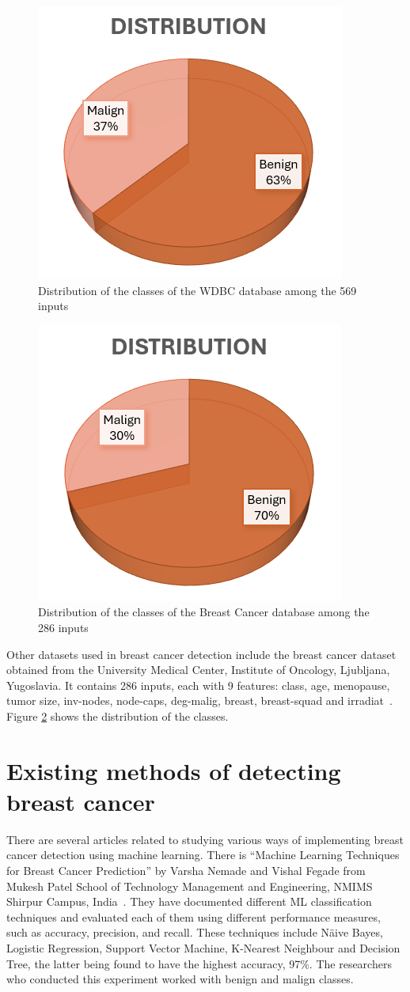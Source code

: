 \begin{figure}[ht!]
    \centering
    \includegraphics[width=0.5\linewidth]{figures/Figure34.png}
    \caption{Distribution of the classes of the WDBC database among the 569 inputs}
    \label{fig:fig28}
\end{figure}

\begin{figure}[H]
    \centering
    \includegraphics[width=0.5\linewidth]{figures/Figure35.png}
    \caption{Distribution of the classes of the Breast Cancer database among the 286 inputs}
    \label{fig:fig29}
\end{figure}

Other datasets used in breast cancer detection include the breast cancer dataset obtained from the University Medical Center, Institute of Oncology, Ljubljana, Yugoslavia. It contains 286 inputs, each with 9 features: class, age, menopause, tumor size, inv-nodes, node-caps, deg-malig, breast, breast-squad and irradiat~\cite{link10}. Figure \ref{fig:fig29} shows the distribution of the classes.

\section{Existing methods of detecting breast cancer}

There are several articles related to studying various ways of implementing breast cancer detection using machine learning. There is “Machine Learning Techniques for Breast Cancer Prediction” by Varsha Nemade and Vishal Fegade from Mukesh Patel School of Technology Management and Engineering, NMIMS Shirpur Campus, India~\cite{carte2}. They have documented different ML classification techniques and evaluated each of them using different performance measures, such as accuracy, precision, and recall. These techniques include N{\"a}ive Bayes, Logistic Regression, Support Vector Machine, K-Nearest Neighbour and Decision Tree, the latter being found to have the highest accuracy, 97\%. The researchers who conducted this experiment worked with benign and malign classes. 

